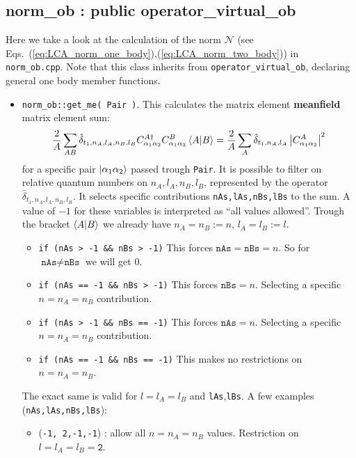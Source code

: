 \documentclass[10pt]{article}
\begin{document}
\subsection{norm\_ob : public operator\_virtual\_ob}
Here we take a look at the calculation of the norm $\mathcal{N}$ (see 
Eqs.~(\ref{eq:LCA_norm_one_body}),(\ref{eq:LCA_norm_two_body})) in 
\texttt{norm\_ob.cpp}.
Note that this class inherits from \texttt{operator\_virtual\_ob}, declaring 
general one body member functions.
\begin{itemize}
	\item \texttt{norm\_ob::get\_me( Pair )}.
		This calculates the matrix element \textbf{meanfield} matrix 
element sum:
		\begin{equation}
		\frac{2}{A} \sum_{ A B } \hat{\delta}_{t_1,n_A,l_A,n_B,l_B} 
C_{\alpha_1 \alpha_2}^{A \dagger} C_{\alpha_1 \alpha_2}^{B} \braket{ A|B} = 
\frac{2}{A} \sum_{A} \hat{\delta}_{t_1,n_A,l_A} \left| C_{\alpha_1 
\alpha_2}^{A} \right|^{2}
		\end{equation}
		for a specific pair $\ket{\alpha_1 \alpha_2}$ passed trough 
\texttt{Pair}.
		It is possible to filter on relative quantum numbers on 
$n_A,l_A,n_B,l_B$, represented by the operator 
$\hat{\delta}_{t_1,n_A,l_A,n_B,l_B}$. It selects specific contributions 
\texttt{nAs,lAs,nBs,lBs} to the sum. A value of $-1$ for these variables is 
interpreted as ``all values allowed''. Trough the bracket $\braket{ A | B }$ we 
already have $n_A = n_B := n$, $l_A = l_B := l$.
		\begin{itemize}
			\item \texttt{if (nAs > -1 \&\& nBs > -1)}
				This forces $\texttt{nAs} = \texttt{nBs} = n$. 
So for $\texttt{nAs} \neq \texttt{nBs}$ we will get $0$.
			\item \texttt{if (nAs == -1 \&\& nBs > -1)}
				This forces $\texttt{nBs} = n$. Selecting a 
specific $n = n_A = n_B$ contribution.
			\item \texttt{if (nAs > -1 \&\& nBs == -1)}
				This forces $\texttt{nAs} = n$. Selecting a 
specific $n = n_A = n_B$ contribution.
			\item \texttt{if (nAs == -1 \&\& nBs == -1)}
				This makes no restrictions on $n = n_A = n_B$.
		\end{itemize}
		The exact same is valid for $l = l_A = l_B$ and 
\texttt{lAs},\texttt{lBs}.
		A few examples (\texttt{nAs,lAs,nBs,lBs}):
		\begin{itemize}
			\item (\texttt{-1, 2,-1,-1}) : allow all $n = n_A = 
n_B$ values. Restriction on $l = l_A = l_B = \texttt{2}$.

\end{itemize}
\end{itemize}
\end{document}
